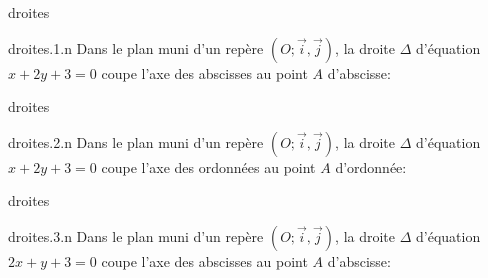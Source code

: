 \begin{qcm}{droites}
    \begin{question}{droites.1.n}
        Dans le plan muni d'un repère $(O;\overrightarrow{i},\overrightarrow{j})$, la droite $\Delta$ d'équation $x+2y+3=0$ coupe l'axe des abscisses au point $A$ d'abscisse:
         \vspace{-1.5ex}
         \begin{multicols}{4}
         \begin{reponses}     
         \end{reponses}
         \end{multicols}
    \end{question}
\end{qcm}


\begin{qcm}{droites}
    \begin{question}{droites.2.n}
        Dans le plan muni d'un repère $(O;\overrightarrow{i},\overrightarrow{j})$, la droite $\Delta$ d'équation $x+2y+3=0$ coupe l'axe des ordonnées au point $A$ d'ordonnée:
         \vspace{-1.5ex}
         \begin{multicols}{4}
         \begin{reponses}         
         \end{reponses}
         \end{multicols}
    \end{question}
\end{qcm}


\begin{qcm}{droites}
    \begin{question}{droites.3.n}
        Dans le plan muni d'un repère $(O;\overrightarrow{i},\overrightarrow{j})$, la droite $\Delta$ d'équation $2x+y+3=0$ coupe l'axe des abscisses au point $A$ d'abscisse:
         \vspace{-1.5ex}
         \begin{multicols}{4}
         \begin{reponses}       
         \end{reponses}
         \end{multicols}
    \end{question}
\end{qcm}


